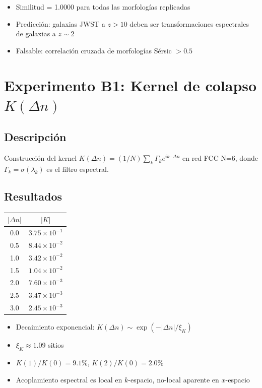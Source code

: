 \documentclass[12pt]{article}
\begin{document}
\begin{itemize}
  \item Similitud = 1.0000 para todas las morfolog\'ias replicadas
  \item Predicci\'on: galaxias JWST a $z>10$ deben ser transformaciones espectrales de galaxias a $z\sim 2$
  \item Falsable: correlaci\'on cruzada de morfolog\'ias S\'ersic $> 0.5$
\end{itemize}

\section{Experimento B1: Kernel de colapso $K(\Delta n)$}

\subsection{Descripci\'on}
Construcci\'on del kernel $K(\Delta n) = (1/N)\sum_k \Gamma_k e^{ik\cdot\Delta n}$ en red FCC N=6, donde $\Gamma_k = \sigma(\lambda_k)$ es el filtro espectral.

\subsection{Resultados}
\begin{center}
\begin{tabular}{cc}
\toprule
$|\Delta n|$ & $|K|$ \\
\midrule
0.0 & $3.75\times10^{-1}$ \\
0.5 & $8.44\times10^{-2}$ \\
1.0 & $3.42\times10^{-2}$ \\
1.5 & $1.04\times10^{-2}$ \\
2.0 & $7.60\times10^{-3}$ \\
2.5 & $3.47\times10^{-3}$ \\
3.0 & $2.45\times10^{-3}$ \\
\bottomrule
\end{tabular}
\end{center}

\begin{itemize}
  \item Decaimiento exponencial: $K(\Delta n) \sim \exp(-|\Delta n|/\xi_K)$
  \item $\xi_K \approx 1.09$ sitios
  \item $K(1)/K(0) = 9.1\%$, $K(2)/K(0) = 2.0\%$
  \item Acoplamiento espectral es local en $k$-espacio, no-local aparente en $x$-espacio
\end{itemize}
\end{document}
